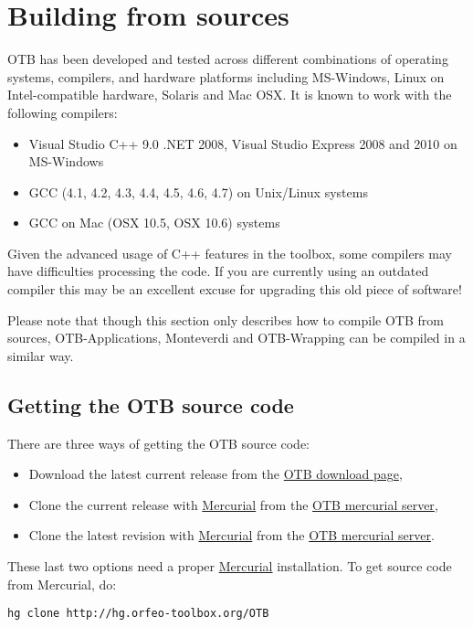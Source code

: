 \section{Building from sources}
\label{sec:source}
OTB has been developed and tested across different combinations of
operating systems, compilers, and hardware platforms including
MS-Windows, Linux on Intel-compatible hardware, Solaris and Mac
OSX.  It is known to work with the following compilers:
\begin{itemize}
\item Visual Studio C++ 9.0 .NET 2008, Visual Studio Express 2008 and 2010 on MS-Windows
\item GCC (4.1, 4.2, 4.3, 4.4, 4.5, 4.6, 4.7) on Unix/Linux systems
\item GCC on Mac (OSX 10.5, OSX 10.6) systems
\end{itemize}

Given the advanced usage of C++ features in the toolbox, some
compilers may have difficulties processing the code. If you are
currently using an outdated compiler this may be an excellent excuse
for upgrading this old piece of software!

Please note that though this section only describes how to compile OTB from sources,
OTB-Applications, Monteverdi and OTB-Wrapping can be compiled in a similar way.

\subsection{Getting the OTB source code}

There are three ways of getting the OTB source code:
\begin{itemize}
\item Download the latest current release from the \href{http://sourceforge.net/projects/orfeo-toolbox/}{OTB download page},
\item Clone the current release with \href{http://mercurial.selenic.com}{Mercurial} from the \href{http://hg.orfeo-toolbox.org/OTB}{OTB mercurial server},
\item Clone the latest revision with \href{http://mercurial.selenic.com}{Mercurial} from the \href{http://hg.orfeo-toolbox.org/OTB}{OTB mercurial server}.
\end{itemize}

These last two options need a proper \href{http://mercurial.selenic.com}{Mercurial} installation. To get source code from Mercurial, do:
\begin{verbatim}
hg clone http://hg.orfeo-toolbox.org/OTB
\end{verbatim}

